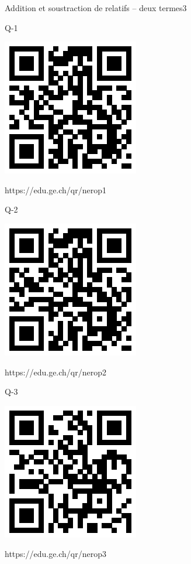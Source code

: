 \documentclass[a4paper,11pt]{report}
\begin{document}
	\begin{qmoodle}{Addition et soustraction de relatifs -- deux termes}{3}{
	\begin{center}	
		Q-1

\includegraphics[scale=1]{media/qr/nerop1}

\tiny{{https://edu.ge.ch/qr/nerop1}}
\end{center}
	\begin{center}	
		Q-2

\includegraphics[scale=1]{media/qr/nerop2}

\tiny{{https://edu.ge.ch/qr/nerop2}}
\end{center}
	\begin{center}	
		Q-3

\includegraphics[scale=1]{media/qr/nerop3}

\tiny{{https://edu.ge.ch/qr/nerop3}}
\end{center}
}
\end{qmoodle}
\end{document}
